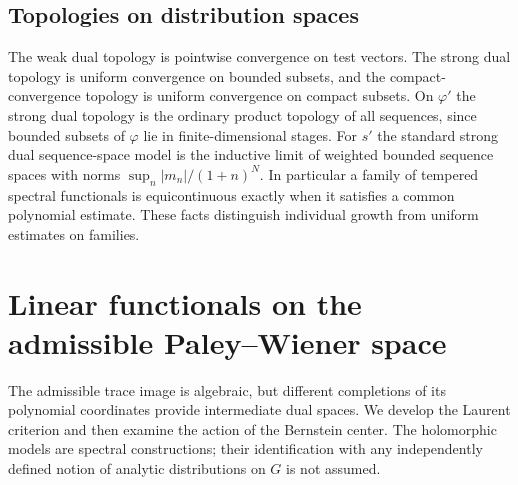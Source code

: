 \subsection{Topologies on distribution spaces}
The weak dual topology is pointwise convergence on test vectors. The strong dual topology is uniform convergence on bounded subsets, and the compact-convergence topology is uniform convergence on compact subsets. On $\varphi'$ the strong dual topology is the ordinary product topology of all sequences, since bounded subsets of $\varphi$ lie in finite-dimensional stages. For $s'$ the standard strong dual sequence-space model is the inductive limit of weighted bounded sequence spaces with norms $\sup_n |m_n|/(1+n)^N$. In particular a family of tempered spectral functionals is equicontinuous exactly when it satisfies a common polynomial estimate. These facts distinguish individual growth from uniform estimates on families.

\section{Linear functionals on the admissible Paley--Wiener space}\label{sec:admissible-duality}
The admissible trace image is algebraic, but different completions of its polynomial coordinates provide intermediate dual spaces. We develop the Laurent criterion and then examine the action of the Bernstein center. The holomorphic models are spectral constructions; their identification with any independently defined notion of analytic distributions on $G$ is not assumed.



